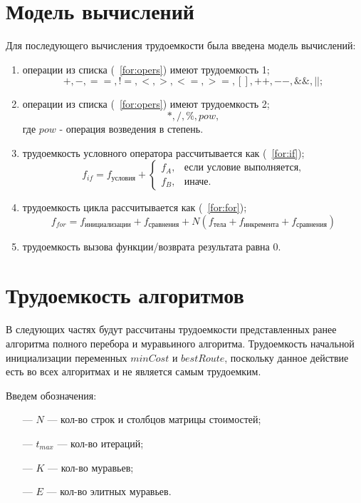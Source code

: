 \clearpage

\section{Модель вычислений}
Для последующего вычисления трудоемкости была введена модель вычислений:
\begin{enumerate}
	\item операции из списка (~\ref{for:opers}) имеют трудоемкость 1;
	\begin{equation}
		\label{for:opers}
		+, -, ==, !=, <, >, <=, >=, [], ++, {-}-, \&\&, ||;
	\end{equation}
    \item операции из списка (~\ref{for:opers}) имеют трудоемкость 2;
	\begin{equation}
		\label{for:opers}
		*, /, \%, pow,
	\end{equation}
    где $pow$ - операция возведения в степень.
	\item трудоемкость условного оператора  рассчитывается как (~\ref{for:if});
	\begin{equation}
		\label{for:if}
		f_{if} = f_{\text{условия}} +
		\begin{cases}
			f_A, & \text{если условие выполняется,}\\
			f_B, & \text{иначе.}
		\end{cases}
	\end{equation}
	\item трудоемкость цикла рассчитывается как (~\ref{for:for});
	\begin{equation}
		\label{for:for}
		f_{for} = f_{\text{инициализации}} + f_{\text{сравнения}} + N(f_{\text{тела}} + f_{\text{инкремента}} + f_{\text{сравнения}})
	\end{equation}
	\item трудоемкость вызова функции/возврата результата равна 0.
\end{enumerate}


\section{Трудоемкость алгоритмов}
В следующих частях будут рассчитаны трудоемкости представленных ранее алгоритма полного перебора и муравьиного алгоритма.
Трудоемкость начальной инициализации переменных $minCost$ и $bestRoute$, поскольку данное действие есть во всех алгоритмах и не является самым трудоемким.

Введем обозначения:
\begin{itemize}
	\item[---] $N$ --- кол-во строк и столбцов матрицы стоимостей;
    \item[---] $t_{max}$ --- кол-во итераций;
    \item[---] $K$ --- кол-во муравьев;
    \item[---] $E$ --- кол-во элитных муравьев.
\end{itemize}

